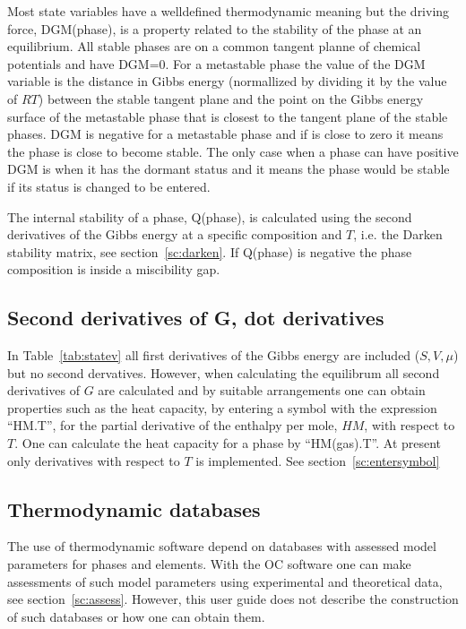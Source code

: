 \documentclass[11pt]{article}
\begin{document}
Most state variables have a welldefined thermodynamic meaning but the
driving force, DGM(phase), is a property related to the stability of
the phase at an equilibrium.  All stable phases are on a common
tangent planne of chemical potentials and have DGM=0.  For a
metastable phase the value of the DGM variable is the distance in
Gibbs energy (normallized by dividing it by the value of $RT$) between
the stable tangent plane and the point on the Gibbs energy surface of
the metastable phase that is closest to the tangent plane of the
stable phases.  DGM is negative for a metastable phase and if is close
to zero it means the phase is close to become stable.  The only case
when a phase can have positive DGM is when it has the dormant status
and it means the phase would be stable if its status is changed to be
entered.

The internal stability of a phase, Q(phase), is calculated using the
second derivatives of the Gibbs energy at a specific composition and
$T$, i.e. the Darken stability matrix, see section~\ref{sc:darken}.
If Q(phase) is negative the phase composition is inside a miscibility
gap.

\hypertarget{Info dotderivatives}{}
\subsection{Second derivatives of G, dot derivatives}\label{sc:dotderivatives}

In Table~\ref{tab:statev} all first derivatives of the Gibbs energy
are included ($S, V, \mu$) but no second dervatives.  However, when
calculating the equilibrum all second derivatives of $G$ are
calculated and by suitable arrangements one can obtain properties such
as the heat capacity, by entering a symbol with the expression
``HM.T'', for the partial derivative of the enthalpy per mole, $HM$,
with respect to $T$.  One can calculate the heat capacity for a phase
by ``HM(gas).T''.  At present only derivatives with respect to $T$ is
implemented.  See section~\ref{sc:entersymbol}

\hypertarget{Info databases}{}
\subsection{Thermodynamic databases}\label{sc:databases}

The use of thermodynamic software depend on databases with assessed
model parameters for phases and elements.  With the OC software one
can make assessments of such model parameters using experimental and
theoretical data, see section~\ref{sc:assess}.  However, this user
guide does not describe the construction of such databases or how one
can obtain them.
\end{document}
